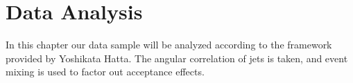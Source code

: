 
\chapter{Data Analysis}

In this chapter our data sample will be analyzed according to the framework provided by Yoshikata Hatta. The angular correlation of jets is taken, and event mixing is used to factor out acceptance effects. 